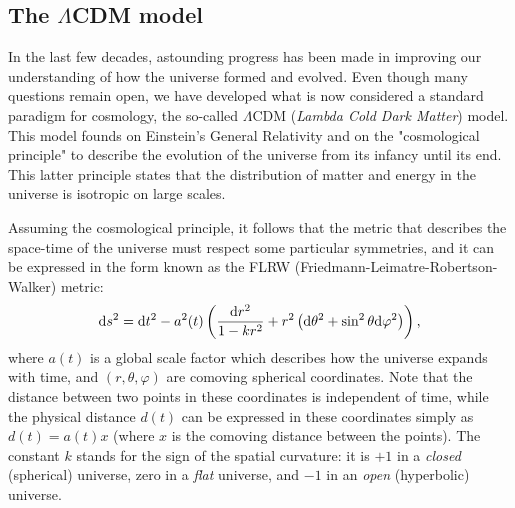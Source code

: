  \subsection{The $\Lambda$CDM model}
 
 In the last few decades, astounding progress has been made in improving our understanding of how the universe formed and evolved. Even though many questions remain open, we have developed what is now considered a standard paradigm for cosmology, the so-called $\Lambda \mathrm{CDM}$ (\textit{Lambda Cold Dark Matter}) model. This model founds on Einstein's General Relativity and on the "cosmological principle" to describe the evolution of the universe from its infancy until its end. This latter principle states that the distribution of matter and energy in the universe is isotropic on large scales. 
 
 Assuming the cosmological principle, it follows that the metric that describes the space-time of the universe must respect some particular symmetries, and it can be expressed in the form known as the FLRW (Friedmann-Leimatre-Robertson-Walker) metric:
 \begin{equation}
     \mathrm{d} s^2 = \mathrm{d} t^2 -a^2(t)\left(\frac{\mathrm{d} r^2}{1-kr^2} + r^2 \left(\mathrm{d} \theta^2 + \sin^2\theta \mathrm{d} \varphi^2\right)\right),
 \end{equation}
 where $a(t)$ is a global scale factor which describes how the universe expands with time, and $(r,\theta,\varphi)$ are comoving spherical coordinates. Note that the distance between two points in these coordinates is independent of time, while the physical distance $d(t)$ can be expressed in these coordinates simply as $d(t)=a(t)x$ (where $x$ is the comoving distance between the points). The constant $k$ stands for the sign of the spatial curvature: it is $+1$ in a \textit{closed} (spherical) universe, zero in a \textit{flat} universe, and $-1$ in an \textit{open} (hyperbolic) universe.
 
 
 


